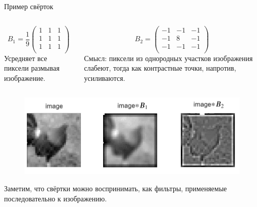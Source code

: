 \documentclass[notheorems, handout]{beamer}
\begin{document}
\begin{frame}{Пример свёрток}
    \begin{columns}
        \begin{column}{0.4\textwidth}
            \[
                B _1 = \frac {1} {9} \begin{pmatrix}
                    1 & 1 & 1\\
                    1 & 1 & 1\\
                    1 & 1 & 1\\
                \end{pmatrix}
            \]
            Усредняет все пиксели размывая изображение.
        \end{column}

        \begin{column}{0.7\textwidth}
            \[
                B _2 = \begin{pmatrix}
                    -1 & -1 & -1\\
                    -1 & 8 & -1\\
                    -1 & -1 & -1\\
                \end{pmatrix}
            \]
            Смысл: пиксели из однородных участков изображения слабеют, тогда как контрастные точки, напротив, усиливаются.
        \end{column}
    \end{columns}
    

    \begin{figure}
        \includegraphics[width=\textwidth]{img/conv_example.jpg}
    \end{figure}

    Заметим, что свёртки можно воспринимать, как фильтры, применяемые последовательно к изображению.
\end{frame}
\end{document}
